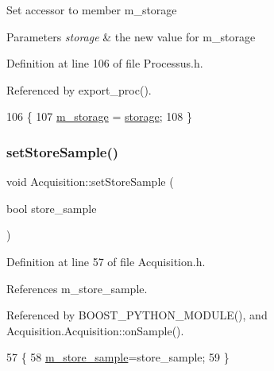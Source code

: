 Set accessor to member m\+\_\+storage 
\begin{DoxyParams}{Parameters}
{\em storage} & the new value for m\+\_\+storage \\
\hline
\end{DoxyParams}


Definition at line 106 of file Processus.\+h.



Referenced by export\+\_\+proc().


\begin{DoxyCode}
106                                       \{
107     \hyperlink{classProcessus_a132b1e71f72327e5a87f0a168c7b6325}{m\_storage} = \hyperlink{classProcessus_a33fa1a0b54a636e5cdd680669fd9ea51}{storage};
108   \}
\end{DoxyCode}
\mbox{\label{classAcquisition_af36a1b660244096b7d274f591f67b695}} 
\subsubsection{\texorpdfstring{set\+Store\+Sample()}{setStoreSample()}}
{\footnotesize\ttfamily void Acquisition\+::set\+Store\+Sample (\begin{DoxyParamCaption}\item[{bool}]{store\+\_\+sample }\end{DoxyParamCaption})\hspace{0.3cm}{\ttfamily [inline]}}



Definition at line 57 of file Acquisition.\+h.



References m\+\_\+store\+\_\+sample.



Referenced by B\+O\+O\+S\+T\+\_\+\+P\+Y\+T\+H\+O\+N\+\_\+\+M\+O\+D\+U\+L\+E(), and Acquisition.\+Acquisition\+::on\+Sample().


\begin{DoxyCode}
57                                         \{
58     \hyperlink{classAcquisition_a987cc1d04007cf1f5acc1accfd0909e5}{m\_store\_sample}=store\_sample;
59   \}
\end{DoxyCode}
\mbox{\label{classAcquisition_a759193856d26354722e5f647e60e16de}} 
